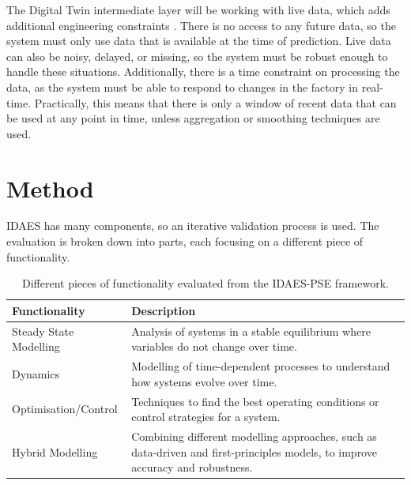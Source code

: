 \documentclass[12pt]{article}
\begin{document}
The Digital Twin intermediate layer will be working with live data, which adds additional engineering constraints \cite{hoi2021online}. 
There is no access to any future data, so the system must only use data that is available at the time of prediction. 
Live data can also be noisy, delayed, or missing, so the system must be robust enough to handle these situations. 
Additionally, there is a time constraint on processing the data, as the system must be able to respond to changes in the factory in real-time. 
Practically, this means that there is only a window of recent data that can be used at any point in time, unless aggregation or smoothing techniques are used.

\section{Method}

IDAES has many components, so an iterative validation process is used. The evaluation is broken down into parts, each focusing on a different piece of functionality. 

\begin{table}[h]
    \centering
    \begin{tabular}{|l|p{10cm}|}
        \hline
        \textbf{Functionality} & \textbf{Description} \\
        \hline
        Steady State Modelling & Analysis of systems in a stable equilibrium where variables do not change over time. \\
        \hline
        Dynamics & Modelling of time-dependent processes to understand how systems evolve over time. \\
        \hline
        Optimisation/Control & Techniques to find the best operating conditions or control strategies for a system. \\
        \hline
        Hybrid Modelling & Combining different modelling approaches, such as data-driven and first-principles models, to improve accuracy and robustness. \\
        \hline
    \end{tabular}
    \caption{Different pieces of functionality evaluated from the IDAES-PSE framework.}
    \label{tab:functionality}
\end{table}
\end{document}
